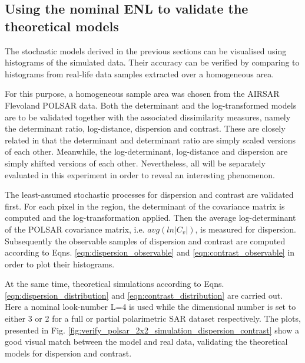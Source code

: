 \documentclass[journal,12pt,draftcls,onecolumn]{IEEEtran}
\begin{document}

\subsection{Using the nominal ENL to validate the theoretical models} 
\label{sec:valid_nominal_enl}

The stochastic models derived in the previous sections can be visualised  using histograms of the simulated data.
Their accuracy can be verified by comparing to  histograms from real-life data samples extracted over a homogeneous area.

For this purpose, a homogeneous sample area was chosen from the AIRSAR Flevoland POLSAR data.
Both the determinant and the log-transformed models are to be validated together with the associated dissimilarity measures, namely the determinant ratio, log-distance, dispersion and contrast.
These are closely related in that the determinant and determinant ratio are simply scaled versions of each other.
Meanwhile, the log-determinant, log-distance and dispersion are simply shifted versions of each other.
Nevertheless, all will be separately evaluated in this experiment in order to reveal an interesting phenomenon.

The least-assumed stochastic processes for dispersion and contrast are validated first.
For each pixel in the region, the determinant of the covariance matrix is computed and the log-transformation applied.
Then the average log-determinant of the POLSAR covariance matrix, i.e. $avg(ln|C_v|)$, is measured for dispersion.
Subsequently the observable samples of dispersion and contrast are computed according to Eqns. \ref{eqn:dispersion_observable} and \ref{eqn:contrast_observable} in order to plot their histograms.

At the same time, theoretical simulations according to Eqns. \ref{eqn:dispersion_distribution} and \ref{eqn:contrast_distribution} are carried out.
Here a nominal look-number L=4 is used
  while the dimensional number is set to either 3 or 2 for a full or partial polarimetric SAR dataset respectively.
The plots, presented in Fig.
  \ref {fig:verify_polsar_2x2_simulation_dispersion_contrast} show a good  visual match between the model and real data, validating the theoretical models for dispersion and contrast.
  
\end{document}

